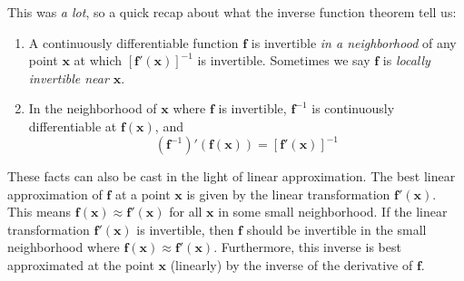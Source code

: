 \documentclass{article}
\newcommand{\x}{\mathbf{x}}
\newcommand{\f}{\mathbf{f}}
\theoremstyle{definition}
\begin{document}
This was \textit{a lot}, so a quick recap about what the inverse function theorem  tell us:
\begin{enumerate}
	\item A continuously differentiable function $ \f $ is invertible \textit{in a neighborhood} of any point $ \x $ at which $ [\f'(\x)]^{-1} $ is invertible. Sometimes we say $ \f $ is \textit{\color{red}locally invertible near $ \x $}. 
	\item In the neighborhood of $ \x $ where $ \f $ is invertible, $ \f^{-1} $ is continuously differentiable at $ \f(\x) $, and 
	$$ (\f^{-1})'(\f(\x)) = [\f'(\x)]^{-1}$$
\end{enumerate}
These facts can also be cast in the light of linear approximation. The best linear approximation of $ \f $ at a point $ \x $ is given by the linear transformation $ \f'(\x) $. This means $ \f(\x) \approx \f'(\x) $ for all $ \x $ in some small neighborhood. If the linear transformation $ \f'(\x) $ is invertible, then $ \f $ should be invertible in the small neighborhood where $ \f(\x) \approx \f'(\x) $. Furthermore, this inverse is best approximated at the point $ \x $ (linearly) by the inverse of the derivative of $ \f $. 
\end{document}
